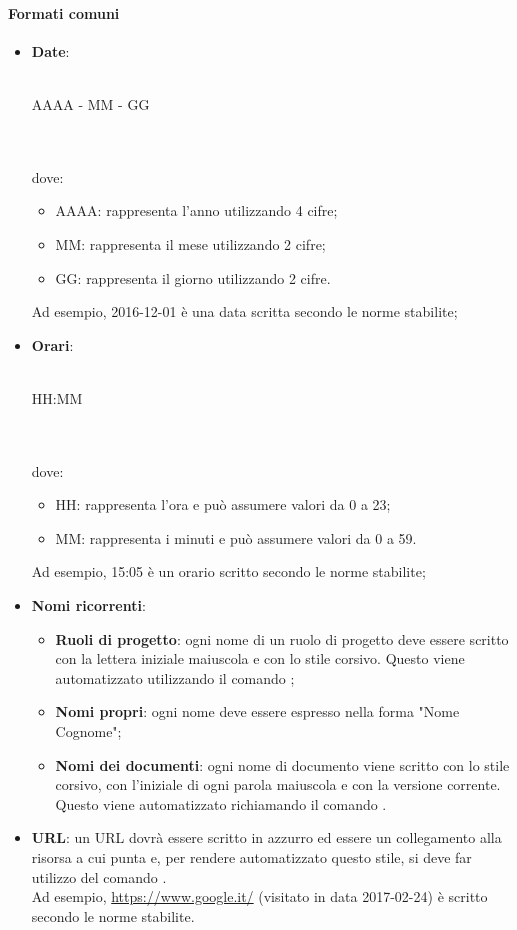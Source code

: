  \paragraph{Formati comuni}
\begin{itemize}
	\item \textbf{Date}:\\ \\ \centerline{AAAA - MM - GG} \\ \\
	dove:
	\begin{itemize}
		\item AAAA: rappresenta l'anno utilizzando 4 cifre;
		\item MM: rappresenta il mese utilizzando 2 cifre;
		\item GG: rappresenta il giorno utilizzando 2 cifre.
	\end{itemize}
	Ad esempio, 2016-12-01 è una data scritta secondo le norme stabilite;
	\item \textbf{Orari}:\\ \\ \centerline{HH:MM} \\ \\dove:
	\begin{itemize}
		\item HH: rappresenta l'ora e può assumere valori da 0 a 23;
		\item MM: rappresenta i minuti e può assumere valori da 0 a 59.
	\end{itemize}
	Ad esempio, 15:05 è un orario scritto secondo le norme stabilite;
	\item \textbf{Nomi ricorrenti}:
	\begin{itemize}
		\item \textbf{Ruoli di progetto}: ogni nome di un ruolo di progetto deve essere scritto con la lettera iniziale maiuscola e con lo stile corsivo. Questo viene automatizzato utilizzando il comando ;
		\item \textbf{Nomi propri}: ogni nome deve essere espresso nella forma "Nome Cognome";
		\item \textbf{Nomi dei documenti}: ogni nome di documento viene scritto con lo stile corsivo, con l'iniziale di ogni parola maiuscola e con la versione corrente. Questo viene automatizzato richiamando il comando .
	\end{itemize}
	\item \textbf{URL}: un URL dovrà essere scritto in azzurro ed essere un collegamento alla risorsa a cui punta e, per rendere automatizzato questo stile, si deve far utilizzo del comando .\\
	Ad esempio, \url{https://www.google.it/} (visitato in data 2017-02-24) è scritto secondo le norme stabilite.
\end{itemize}
